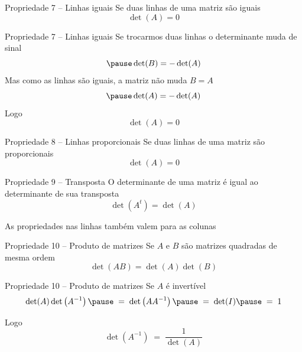 \documentclass[fleqn,aspectratio=169,12pt]{beamer}
\begin{document}
\begin{frame}{Propriedade 7 -- Linhas iguais}
  Se duas linhas de uma matriz são iguais
  \pause
  \[
    \det(A) = 0
  \]
\end{frame}

\begin{frame}{Propriedade 7 -- Linhas iguais}
  Se trocarmos duas linhas o determinante muda de sinal
  \[
    \pause
    \det(B) = - \det(A)
  \]
  \pause
  Mas como as linhas são iguais, a matriz não muda \(B=A\)
  \[
    \pause
    \det(A) = - \det(A)
  \]
  \pause
  Logo
  \[
    \det(A) = 0
  \]
\end{frame}

\begin{frame}{Propriedade 8 -- Linhas proporcionais}
  Se duas linhas de uma matriz são proporcionais
  \[
    \det(A) = 0
  \]
\end{frame}



\begin{frame}{Propriedade 9 -- Transposta}
  O determinante de uma matriz é igual ao determinante de sua transposta
  \[
    \det\left(A^t\right) = \det(A)
  \]

  \pause
  As propriedades nas linhas também valem para as colunas
\end{frame}

\begin{frame}{Propriedade 10 -- Produto de matrizes}
  Se $A$ e $B$ são matrizes quadradas de mesma ordem
  \[
    \det(AB) = \det(A) \det(B)
  \]
\end{frame}

\begin{frame}{Propriedade 10 -- Produto de matrizes}
  Se $A$ é invertível
  \pause
  \[
    \det(A)\det\left(A^{-1}\right)
    \pause
    \;=\; \det\left(AA^{-1}\right)
    \pause
    \;=\; \det(I)
    \pause
    \;=\; 1
  \]

  \pause
  Logo
  \[
    \det(A^{-1})
    \;=\; \frac{1}{\det(A)}
  \]
\end{frame}
\end{document}
